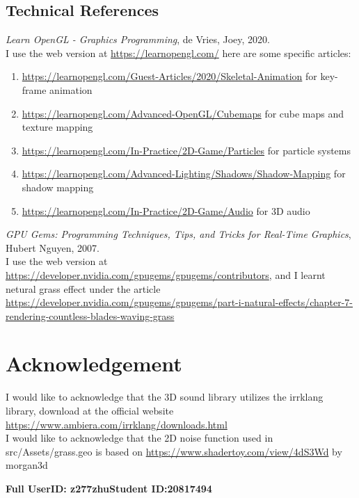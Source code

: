 \documentclass {article}
\begin{document}
\subsection{Technical References}
\textit{Learn OpenGL - Graphics Programming}, de Vries, Joey, 2020. \\
    I use the web version at \url{https://learnopengl.com/} here are some specific articles:
    \begin{enumerate}
        \item \url{https://learnopengl.com/Guest-Articles/2020/Skeletal-Animation} for key-frame animation
        \item \url{https://learnopengl.com/Advanced-OpenGL/Cubemaps} for cube maps and texture mapping
        \item \url{https://learnopengl.com/In-Practice/2D-Game/Particles} for particle systems
        \item \url{https://learnopengl.com/Advanced-Lighting/Shadows/Shadow-Mapping} for shadow mapping
        \item \url{https://learnopengl.com/In-Practice/2D-Game/Audio} for 3D audio
    \end{enumerate}
    \textit{ GPU Gems: Programming Techniques, Tips, and Tricks for Real-Time Graphics}, Hubert Nguyen, 2007. \\
    I use the web version at \url{https://developer.nvidia.com/gpugems/gpugems/contributors}, and I learnt netural grass
    effect under the article \url{https://developer.nvidia.com/gpugems/gpugems/part-i-natural-effects/chapter-7-rendering-countless-blades-waving-grass}

\section{Acknowledgement}
    I would like to acknowledge that the 3D sound library utilizes the irrklang library, download at the official website \url{https://www.ambiera.com/irrklang/downloads.html} \\
    I would like to acknowledge that the 2D noise function used in src/Assets/grass.geo is based on \url{https://www.shadertoy.com/view/4dS3Wd} by morgan3d
\newpage




{\hfill{\bf Full UserID: z277zhu}\hfill{\bf Student ID:20817494}\hfill}
\end{document}

